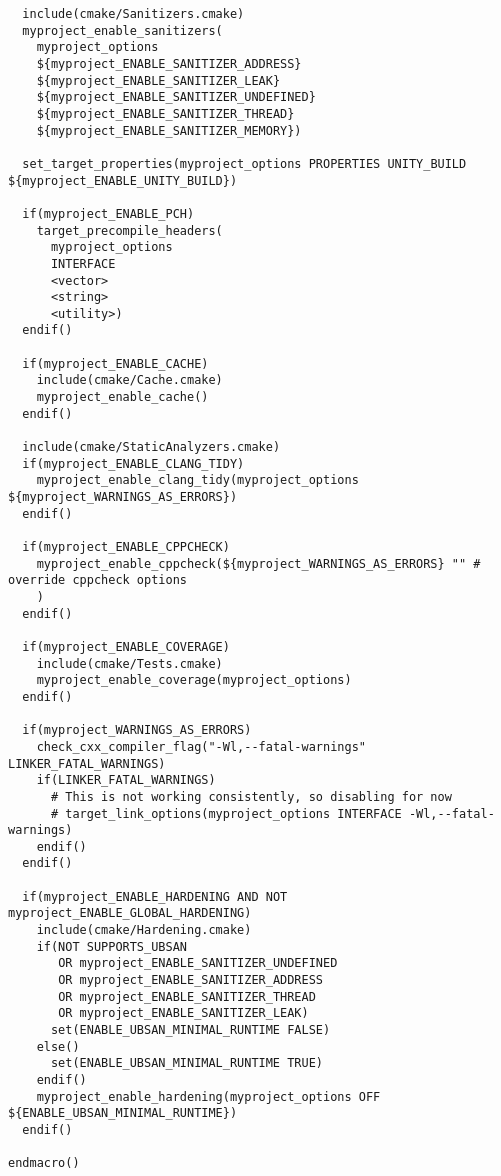 \begin{verbatim}
  include(cmake/Sanitizers.cmake)
  myproject_enable_sanitizers(
    myproject_options
    ${myproject_ENABLE_SANITIZER_ADDRESS}
    ${myproject_ENABLE_SANITIZER_LEAK}
    ${myproject_ENABLE_SANITIZER_UNDEFINED}
    ${myproject_ENABLE_SANITIZER_THREAD}
    ${myproject_ENABLE_SANITIZER_MEMORY})

  set_target_properties(myproject_options PROPERTIES UNITY_BUILD ${myproject_ENABLE_UNITY_BUILD})

  if(myproject_ENABLE_PCH)
    target_precompile_headers(
      myproject_options
      INTERFACE
      <vector>
      <string>
      <utility>)
  endif()

  if(myproject_ENABLE_CACHE)
    include(cmake/Cache.cmake)
    myproject_enable_cache()
  endif()

  include(cmake/StaticAnalyzers.cmake)
  if(myproject_ENABLE_CLANG_TIDY)
    myproject_enable_clang_tidy(myproject_options ${myproject_WARNINGS_AS_ERRORS})
  endif()

  if(myproject_ENABLE_CPPCHECK)
    myproject_enable_cppcheck(${myproject_WARNINGS_AS_ERRORS} "" # override cppcheck options
    )
  endif()

  if(myproject_ENABLE_COVERAGE)
    include(cmake/Tests.cmake)
    myproject_enable_coverage(myproject_options)
  endif()

  if(myproject_WARNINGS_AS_ERRORS)
    check_cxx_compiler_flag("-Wl,--fatal-warnings" LINKER_FATAL_WARNINGS)
    if(LINKER_FATAL_WARNINGS)
      # This is not working consistently, so disabling for now
      # target_link_options(myproject_options INTERFACE -Wl,--fatal-warnings)
    endif()
  endif()

  if(myproject_ENABLE_HARDENING AND NOT myproject_ENABLE_GLOBAL_HARDENING)
    include(cmake/Hardening.cmake)
    if(NOT SUPPORTS_UBSAN 
       OR myproject_ENABLE_SANITIZER_UNDEFINED
       OR myproject_ENABLE_SANITIZER_ADDRESS
       OR myproject_ENABLE_SANITIZER_THREAD
       OR myproject_ENABLE_SANITIZER_LEAK)
      set(ENABLE_UBSAN_MINIMAL_RUNTIME FALSE)
    else()
      set(ENABLE_UBSAN_MINIMAL_RUNTIME TRUE)
    endif()
    myproject_enable_hardening(myproject_options OFF ${ENABLE_UBSAN_MINIMAL_RUNTIME})
  endif()

endmacro()
\end{verbatim}









